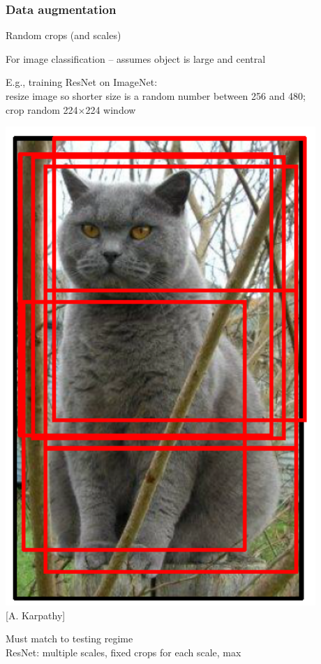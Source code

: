 \documentclass[xcolor=dvipsnames]{beamer}
\begin{document}
\begin{frame}
  \frametitle{Data augmentation}
  \bi
\item Random crops (and scales)
\item For image classification -- assumes object is large and central
\ei
  \begin{minipage}[c]{.65\linewidth}
    \bi
\item E.g., training ResNet on ImageNet:\\
resize image so shorter size is a random number between 256 and 480;\\
crop random 224$\times$224 window
\ei
  \end{minipage}%
  \begin{minipage}[c]{.35\linewidth}
    \includegraphics[width=.45\textwidth]{ak-crops-random}
\\{[A. Karpathy]}

  \end{minipage}
\bi
\item Must match to testing regime\\
ResNet: multiple scales, fixed crops for each scale, max
\ei
\end{frame}
\end{document}
